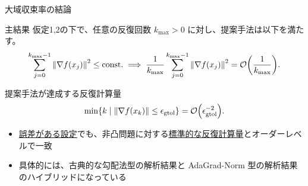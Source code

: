\documentclass[dvipdfmx,12pt,aspectratio=169]{beamer}
\newcommand{\gtol}{\epsilon_{\mathrm{gtol}}}
\begin{document}
\begin{frame}{大域収束率の結論}
  \begin{block}{主結果}
    仮定1,2の下で、任意の反復回数 $k_{\max}>0$ に対し、提案手法は以下を満たす。
    \begin{equation*}
      \sum_{j=0}^{k_{\max}-1} \norm{\nabla f(x_j)}^2 \le \text{const.}
      \implies
      \frac{1}{k_{\max}}\sum_{j=0}^{k_{\max}-1} \norm{\nabla f(x_j)}^2 = \order{\frac{1}{k_{\max}}}.
    \end{equation*}
  \end{block}
  \begin{exampleblock}{提案手法が達成する反復計算量}
    \[
      \min\{k \mid \norm{\nabla f(x_k)} \le \gtol\}
      = \order{\gtol^{-2}}.
    \]
  \end{exampleblock}
  \begin{itemize}
    \item \underline{誤差がある設定}でも、非凸問題に対する\underline{標準的な反復計算量}とオーダーレベルで一致
    \item 具体的には、古典的な勾配法型の解析結果と AdaGrad-Norm 型の解析結果\\
          のハイブリッドになっている
  \end{itemize}
\end{frame}
\end{document}
